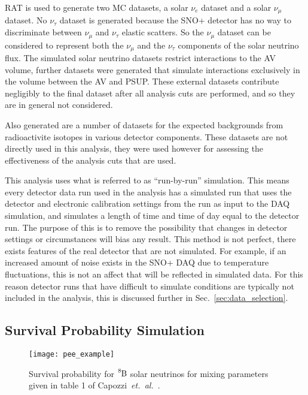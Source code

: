 RAT is used to generate two MC datasets, a solar $\nu_{e}$ dataset
and a solar $\nu_{\mu}$ dataset.
No $\nu_{\tau}$ dataset is generated because the SNO+ detector has
no way to discriminate between $\nu_{\mu}$ and $\nu_{\tau}$ elastic scatters.
So the $\nu_{\mu}$ dataset can be considered to represent both the $\nu_{\mu}$
and the $\nu_{\tau}$ components of the solar neutrino flux.
The simulated solar neutrino datasets restrict interactions to the AV volume,
further datasets were generated that simulate interactions exclusively in the
volume between the AV and PSUP\@.
These external datasets contribute negligibly to the final dataset after all
analysis cuts are performed, and so they are in general not considered.

Also generated are a number of datasets for the expected backgrounds from
radioactivite isotopes in various detector components.
These datasets are not directly used in this analysis, they were used however
for assessing the effectiveness of the analysis cuts that are used.

This analysis uses what is referred to as ``run-by-run'' simulation.
This means every detector data run used in the analysis has a simulated run that uses
the detector and electronic calibration settings from the run as input to the DAQ simulation, and simulates
a length of time and time of day equal to the detector run.
The purpose of this is to remove the possibility that changes in detector settings
or circumstances will bias any result.
This method is not perfect, there exists features of the real detector
that are not simulated.
For example, if an increased amount of noise exists in the SNO+ DAQ due to
temperature fluctuations, this is not an affect that will be reflected in
simulated data.
For this reason detector runs that have difficult to simulate conditions 
are typically not included in the analysis, this is discussed further
in Sec.~\ref{sec:data_selection}.

\subsection{Survival Probability Simulation}
\label{sec:survival_prob}
\begin{figure}[htbp]
\centering
\texttt{[image: pee\_example]}
\caption[$\ce{^{8}B}$ Solar Neutrino Survival Probability]{
Survival probability for $\ce{^{8}B}$ solar neutrinos for mixing parameters
given in table 1 of Capozzi~\textit{et.\ al.}~\citep{pdg_globalfit}.
}
\label{fig:example_survival_prob}
\end{figure}

